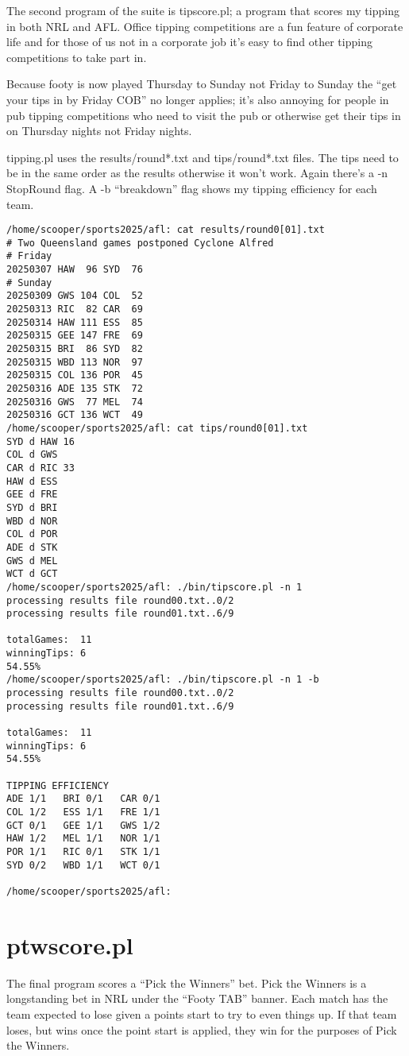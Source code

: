 \documentclass{article}
\begin{document}
The second program of the suite is tipscore.pl; a program that scores
my tipping in both NRL and AFL. Office tipping competitions are a fun
feature of corporate life and for those of us not in a corporate job
it's easy to find other tipping competitions to take part in.

Because footy is now played Thursday to Sunday not Friday to Sunday
the ``get your tips in by Friday COB'' no longer applies; it's also
annoying for people in pub tipping competitions who need to visit the
pub or otherwise get their tips in on Thursday nights not Friday
nights.

tipping.pl uses the results/round*.txt and tips/round*.txt files. The
tips need to be in the same order as the results otherwise it won't
work. Again there's a -n StopRound flag. A -b ``breakdown'' flag shows
my tipping efficiency for each team.

\begin{verbatim}
/home/scooper/sports2025/afl: cat results/round0[01].txt
# Two Queensland games postponed Cyclone Alfred
# Friday
20250307 HAW  96 SYD  76
# Sunday
20250309 GWS 104 COL  52
20250313 RIC  82 CAR  69
20250314 HAW 111 ESS  85
20250315 GEE 147 FRE  69
20250315 BRI  86 SYD  82
20250315 WBD 113 NOR  97
20250315 COL 136 POR  45
20250316 ADE 135 STK  72
20250316 GWS  77 MEL  74
20250316 GCT 136 WCT  49
/home/scooper/sports2025/afl: cat tips/round0[01].txt
SYD d HAW 16
COL d GWS
CAR d RIC 33
HAW d ESS
GEE d FRE
SYD d BRI
WBD d NOR
COL d POR
ADE d STK
GWS d MEL
WCT d GCT
/home/scooper/sports2025/afl: ./bin/tipscore.pl -n 1
processing results file round00.txt..0/2
processing results file round01.txt..6/9

totalGames:  11
winningTips: 6
54.55%
/home/scooper/sports2025/afl: ./bin/tipscore.pl -n 1 -b
processing results file round00.txt..0/2
processing results file round01.txt..6/9

totalGames:  11
winningTips: 6
54.55%

TIPPING EFFICIENCY
ADE 1/1   BRI 0/1   CAR 0/1
COL 1/2   ESS 1/1   FRE 1/1
GCT 0/1   GEE 1/1   GWS 1/2
HAW 1/2   MEL 1/1   NOR 1/1
POR 1/1   RIC 0/1   STK 1/1
SYD 0/2   WBD 1/1   WCT 0/1

/home/scooper/sports2025/afl:
\end{verbatim}

\section{ptwscore.pl}

The final program scores a ``Pick the Winners'' bet. Pick the Winners
is a longstanding bet in NRL under the ``Footy TAB'' banner. Each
match has the team expected to lose given a points start to try to
even things up. If that team loses, but wins once the point start is
applied, they win for the purposes of Pick the Winners.
\end{document}
